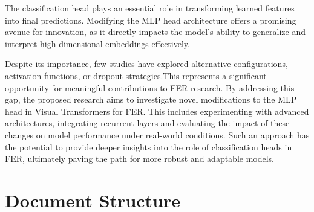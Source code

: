 The classification head plays an essential role in transforming learned features into final predictions. Modifying the MLP head architecture offers a promising avenue for innovation, as it directly impacts the model’s ability to generalize and interpret high-dimensional embeddings effectively. 

Despite its importance, few studies have explored alternative configurations, activation functions, or dropout strategies.This represents a significant opportunity for meaningful contributions to FER research. By addressing this gap, the proposed research aims to investigate novel modifications to the MLP head in Visual Transformers for FER. This includes experimenting with advanced architectures, integrating recurrent layers and evaluating the impact of these changes on model performance under real-world conditions. Such an approach has
the potential to provide deeper insights into the role of classification heads in FER, ultimately paving the path for more robust and adaptable models.

\section{Document Structure}
%
%

%
%
%
%


